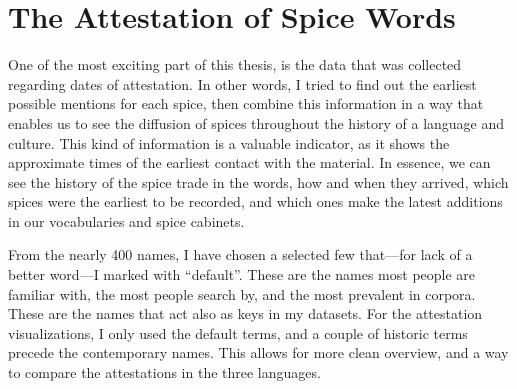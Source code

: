 


\section{The Attestation of Spice Words}

One of the most exciting part of this thesis, is the data that was collected regarding dates of attestation. In other words, I tried to find out the earliest possible mentions for each spice, then combine this information in a way that enables us to see the diffusion of spices throughout the history of a language and culture. This kind of information is a valuable indicator, as it shows the approximate times of the earliest contact with the material. In essence, we can see the history of the spice trade in the words, how and when they arrived, which spices were the earliest to be recorded, and which ones make the latest additions in our vocabularies and spice cabinets. 

From the nearly 400 names, I have chosen a selected few that---for lack of a better word---I marked with ``default''. These are the names most people are familiar with, the most people search by, and the most prevalent in corpora. These are the names that act also as keys in my datasets. For the attestation visualizations, I only used the default terms, and a couple of historic terms precede the contemporary names. This allows for more clean overview, and a way to compare the attestations in the three languages. 

